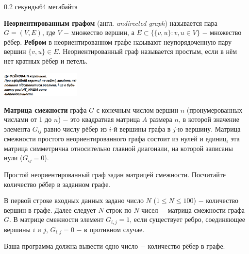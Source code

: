 \begin{problem}{}{}{}{0.2 секунды}{64 мегабайта}

{\bf Неориентированным графом} (англ. {\emph{undirected graph}}) называется пара $G=(V,E)$, 
где $V$ $-$ множество вершин, а $E \subset \{\{v,u\}: v,u \in V\}$ $-$ множество рёбер.
{\bf Ребром} в неориентированном графе называют неупорядоченную пару вершин $\{v,u\} \in E$.
Неориентированный граф называется простым, если в нём нет кратных рёбер и петель.

 \begin{center}
    \includegraphics[width=0.30\textwidth,natwidth=232,natheight=217]{pic.png}
  \end{center}

{\bf Матрица смежности} графа $G$ с конечным числом вершин $n$ (пронумерованных числами от $1$ до $n$) $-$ 
это квадратная матрица $A$ размера $n$, в которой значение элемента $G_{ij}$ равно числу рёбер из $i$-й вершины графа в $j$-ю вершину.
Матрица смежности простого неориентированного графа состоит из нулей и единиц, 
эта матрица симметрична относительно главной диагонали, на которой записаны нули ($G_{ij} = 0$).

Простой неориентированный граф задан матрицей смежности. Посчитайте количество рёбер в заданном графе.

\InputFile
В первой строке входных данных задано число $N$ ($1 \le N \le 100$) $-$ количество вершин в графе.
Далее следует $N$ строк по $N$ чисел $-$ матрица смежности графа $G$. В матрице смежности элемент $G_{i,j}=1$, если
существует ребро, соединяющее вершины $i$ и $j$, $G_{i,j}=0$ $-$ в противном случае.

\OutputFile
Ваша программа должна вывести одно число $-$ количество рёбер в графе.

\Example

\begin{example}
%
\end{example}

\end{problem}

